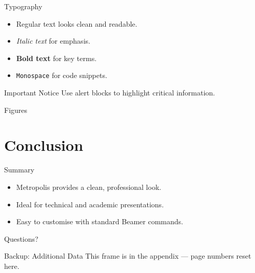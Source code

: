 \documentclass[aspectratio=169]{beamer}
\begin{document}
\begin{frame}{Typography}
  \begin{itemize}
    \item Regular text looks clean and readable.
    \item \textit{Italic text} for emphasis.
    \item \textbf{Bold text} for key terms.
    \item \texttt{Monospace} for code snippets.
  \end{itemize}

  \vspace{1em}
  \begin{alertblock}{Important Notice}
    Use alert blocks to highlight critical information.
  \end{alertblock}
\end{frame}

\begin{frame}{Figures}
  \begin{figure}
  \end{figure}
\end{frame}

\section{Conclusion}

\begin{frame}{Summary}
  \begin{itemize}
    \item Metropolis provides a clean, professional look.
    \item Ideal for technical and academic presentations.
    \item Easy to customise with standard Beamer commands.
  \end{itemize}
\end{frame}

\begin{frame}[standout]
  Questions?
\end{frame}

\appendix

\begin{frame}{Backup: Additional Data}
  This frame is in the appendix — page numbers reset here.
\end{frame}
\end{document}
